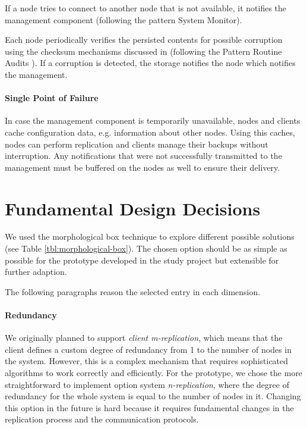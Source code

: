 If a \gls{node} tries to connect to another \gls{node} that is not available, it notifies the \gls{management} component (following the pattern System Monitor\cite{fault-tolerance}).

Each \gls{node} periodically verifies the persisted contents for possible corruption using the checksum mechanisms discussed in  (following the Pattern Routine Audits \cite{fault-tolerance}). If a corruption is detected, the \gls{storage} notifies the \gls{node} which notifies the \gls{management}.

\paragraph{Single Point of Failure} In case the \gls{management} component is temporarily unavailable, \glspl{node} and \glspl{client} cache configuration data, e.g. information about other \glspl{node}. Using this caches, \glspl{node} can perform replication and \glspl{client} manage their backups without interruption. Any notifications that were not successfully transmitted to the \gls{management} must be buffered on the \glspl{node} as well to ensure their delivery.

\section{Fundamental Design Decisions}\label{sec:fundamental-design-decisions}

We used the morphological box technique to explore different possible solutions (see Table \ref{tbl:morphological-box}). The chosen option should be as simple as possible for the prototype developed in the study project but extensible for further adaption.

The following paragraphs reason the selected entry in each dimension.

\paragraph{Redundancy}
We originally planned to support \emph{client m-replication}, which means that the \gls{client} defines a custom degree of redundancy from 1 to the number of \glspl{node} in the system. However, this is a complex mechanism that requires sophisticated algorithms to work correctly and efficiently. For the prototype, we chose the more straightforward to implement option system \emph{n-replication}, where the degree of redundancy for the whole system is equal to the number of \glspl{node} in it. Changing this option in the future is hard because it requires fundamental changes in the replication process and the communication protocols.


